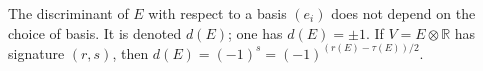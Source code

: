 The discriminant of $E$ with respect to a basis $(e_i)$ does not depend on the choice of basis. It is denoted $d(E)$; one has $d(E) = \pm 1$. If $V = E \otimes \mathbb{R}$ has signature $(r,s)$, then $d(E) = (-1)^s = (-1)^{(r(E)-\tau(E))/2}$.
